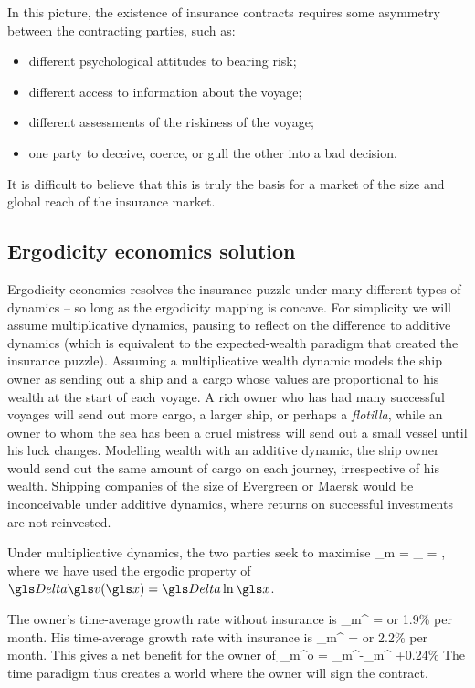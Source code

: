 In this picture, the existence of insurance contracts requires some asymmetry 
between the contracting parties, such as:
\begin{itemize}
\item different psychological attitudes to bearing risk;
\item different access to information about the voyage;
\item different assessments of the riskiness of the voyage;
\item one party to deceive, coerce, or gull the other into a bad decision.
\end{itemize}
It is difficult to believe that this is truly the basis for a market of the size and 
global reach of the insurance market.

\subsection{Ergodicity economics solution}

Ergodicity economics resolves the insurance puzzle under many
different types of dynamics -- so long as the ergodicity mapping is
concave. For simplicity we will assume multiplicative dynamics, pausing 
to reflect on the difference to additive dynamics (which is equivalent to 
the expected-wealth paradigm that created the insurance puzzle). 
Assuming a multiplicative wealth dynamic models the 
ship owner as sending out a ship and a cargo whose values are proportional to 
his wealth at the start of each voyage. A rich owner who has had many 
successful voyages will send out more cargo, a larger ship, or perhaps a 
\textit{flotilla}, while an owner to whom the sea has been a cruel mistress 
will send out a small vessel until his luck changes. Modelling wealth with an
additive dynamic, the ship owner would send out the same amount
of cargo on each journey, irrespective of his wealth. Shipping companies
of the size of Evergreen or Maersk would be inconceivable under additive 
dynamics, where returns on successful investments are not reinvested.

Under multiplicative dynamics, the two parties seek to maximise
\be
\gt_m = \lim_{\Dt\to\infty}\frac{\D\gv(\x)}{\Dt} = \frac{\ave{\d\ln \x}}{\dt},
\ee
where we have used the ergodic property of $\D\gv(\x)=\D\ln\x$.

The owner's time-average growth rate without insurance is 
\be
\gt_m^ = 
\ee
or 1.9\% per month. 
His time-average growth rate with insurance is 
\be
\gt_m^ = 
\ee
or 2.2\% per month. This gives a net benefit for the owner of
\be
\d\gt_m^o = \gt_m^-\gt_m^ \approx +0.24\%  
\ee
The time paradigm thus creates a world where the owner will sign the contract.

